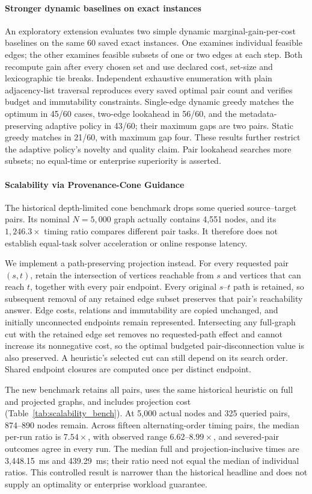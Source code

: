\paragraph{Stronger dynamic baselines on exact instances}
An exploratory extension evaluates two simple dynamic marginal-gain-per-cost baselines on the same 60 saved exact instances. One examines individual feasible edges; the other examines feasible subsets of one or two edges at each step. Both recompute gain after every chosen set and use declared cost, set-size and lexicographic tie breaks. Independent exhaustive enumeration with plain adjacency-list traversal reproduces every saved optimal pair count and verifies budget and immutability constraints. Single-edge dynamic greedy matches the optimum in 45/60 cases, two-edge lookahead in 56/60, and the metadata-preserving adaptive policy in 43/60; their maximum gaps are two pairs. Static greedy matches in 21/60, with maximum gap four. These results further restrict the adaptive policy's novelty and quality claim. Pair lookahead searches more subsets; no equal-time or enterprise superiority is asserted.

\paragraph{Scalability via Provenance-Cone Guidance}
The historical depth-limited cone benchmark drops some queried source--target pairs. Its nominal $N=5,000$ graph actually contains 4,551 nodes, and its $1,246.3\times$ timing ratio compares different pair tasks. It therefore does not establish equal-task solver acceleration or online response latency.

We implement a path-preserving projection instead. For every requested pair $(s,t)$, retain the intersection of vertices reachable from $s$ and vertices that can reach $t$, together with every pair endpoint. Every original $s$--$t$ path is retained, so subsequent removal of any retained edge subset preserves that pair's reachability answer. Edge costs, relations and immutability are copied unchanged, and initially unconnected endpoints remain represented. Intersecting any full-graph cut with the retained edge set removes no requested-path effect and cannot increase its nonnegative cost, so the optimal budgeted pair-disconnection value is also preserved. A heuristic's selected cut can still depend on its search order. Shared endpoint closures are computed once per distinct endpoint.

The new benchmark retains all pairs, uses the same historical heuristic on full and projected graphs, and includes projection cost (Table~\ref{tab:scalability_bench}). At 5,000 actual nodes and 325 queried pairs, 874--890 nodes remain. Across fifteen alternating-order timing pairs, the median per-run ratio is $7.54\times$, with observed range $6.62$--$8.99\times$, and severed-pair outcomes agree in every run. The median full and projection-inclusive times are 3,448.15~ms and 439.29~ms; their ratio need not equal the median of individual ratios. This controlled result is narrower than the historical headline and does not supply an optimality or enterprise workload guarantee.
